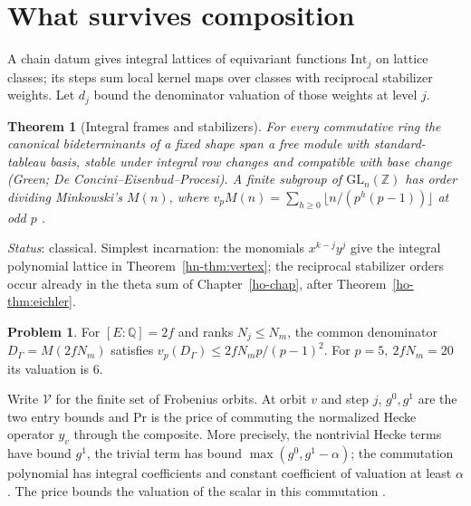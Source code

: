 \documentclass[reqno]{amsart}
\newcounter{chap}
\theoremstyle{definition}
\newtheorem{problem}{Problem}[section]
\theoremstyle{plain}
\newtheorem{theorem}{Theorem}[section]
\newcommand{\Z}{\mathbb Z}
\newcommand{\Q}{\mathbb Q}
\newcommand{\Int}{\mathrm{Int}}
\begin{document}
\section{What survives composition}\label{sec:chain}
A chain datum \cite[Def.~10.1]{Adr} gives integral lattices of equivariant functions \(\Int_j\) on lattice classes; its steps sum local kernel maps over classes with reciprocal stabilizer weights. Let \(d_j\) bound the denominator valuation of those weights at level \(j\).

\begin{theorem}[Integral frames and stabilizers]\label{thm:frames}
For every commutative ring the canonical bideterminants of a fixed shape span a free module with standard-tableau basis, stable under integral row changes and compatible with base change (Green; De Concini--Eisenbud--Procesi). A finite subgroup of \(\mathrm{GL}_n(\Z)\) has order dividing Minkowski's \(M(n)\), where \(v_p M(n)=\sum_{h\ge0}\lfloor n/(p^h(p-1))\rfloor\) at odd \(p\) \cite[Thms.~11.2 and~11.13]{Adr}.
\end{theorem}
\noindent \emph{Status}: classical. Simplest incarnation: the monomials \(x^{k-j}y^j\) give the integral polynomial lattice in Theorem~\ref{hn-thm:vertex}; the reciprocal stabilizer orders occur already in the theta sum of Chapter~\ref{ho-chap}, after Theorem~\ref{ho-thm:eichler}.

\begin{problem}\label{pr:minkowski}
For \([E:\Q]=2f\) and ranks \(N_j\le N_m\), the common denominator \(D_\Gamma=M(2fN_m)\) satisfies \(v_p(D_\Gamma)\le 2fN_m p/(p-1)^2\). For \(p=5,\ 2fN_m=20\) its valuation is \(6\).
\end{problem}

Write \(\mathcal V\) for the finite set of Frobenius orbits. At orbit \(v\) and step \(j\), \(g^0,g^1\) are the two entry bounds and \(\mathrm{Pr}\) is the price of commuting the normalized Hecke operator \(y_v\) through the composite. More precisely, the nontrivial Hecke terms have bound \(g^1\), the trivial term has bound \(\max(g^0,g^1-\alpha)\); the commutation polynomial has integral coefficients and constant coefficient of valuation at least \(\alpha\). The price bounds the valuation of the scalar in this commutation \cite[Defs.~10.4 and~10.5, Thm.~10.7]{Adr}.
\end{document}
